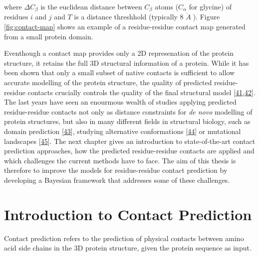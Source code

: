 \documentclass[11pt,a4paper,twoside]{book}
\newcommand{\Cb}{C_\beta}
\newcommand{\angstrom}{\mathring{A} \;}
\theoremstyle{definition}
\theoremstyle{definition}
\theoremstyle{remark}
\begin{document}
where \(\Delta \Cb\) is the euclidean distance between \(\Cb\) atoms
(\(C_\alpha\) for glycine) of residues \(i\) and \(j\) and \(T\) is a
distance threshhold (typically 8 \(\angstrom\)). Figure
\ref{fig:contact-map} shows an example of a residue-residue contact map
generated from a small protein domain.

Eventhough a contact map provides only a 2D represenation of the protein
structure, it retains the full 3D structural information of a protein.
While it has been shown that only a small subset of native contacts is
sufficient to allow accurate modelling of the protein structure, the
quality of predicted residue-residue contacts crucially controls the
quality of the final structural model
{[}\protect\hyperlink{ref-Kim2014}{41},\protect\hyperlink{ref-Duarte2010}{42}{]}.
The last years have seen an enourmous wealth of studies applying
predicted residue-residue contacts not only as distance constraints for
\emph{de novo} modelling of protein structures, but also in many
different fields in structural biology, such as domain prediction
{[}\protect\hyperlink{ref-Sadowski2013}{43}{]}, studying alternative
conformations {[}\protect\hyperlink{ref-Parisi2015a}{44}{]} or
mutational landscapes {[}\protect\hyperlink{ref-Hopf2017}{45}{]}. The
next chapter gives an introduction to state-of-the-art contact
prediction approaches, how the predicted residue-residue contacts are
applied and which challenges the current methods have to face. The aim
of this thesis is therefore to improve the models for residue-residue
contact prediction by developing a Bayesian framework that addresses
some of these challenges.

\section{Introduction to Contact
Prediction}\label{introduction-to-contact-prediction}

Contact prediction refers to the prediction of physical contacts between
amino acid side chains in the 3D protein structure, given the protein
sequence as input.
\end{document}
